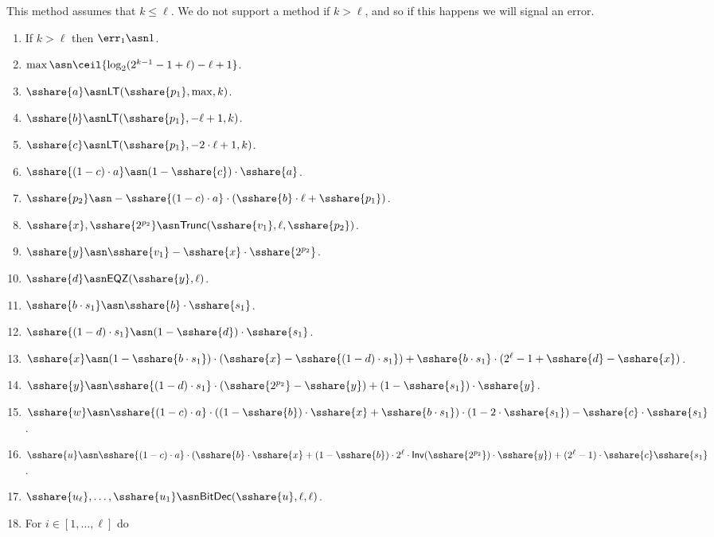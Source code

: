 This method assumes that $k \le \ell$.
We do not support a method if $k > \ell$, and so if this happens
we will signal an error.
\begin{enumerate}
\item If $k>\ell$ then $\err_1 \asn 1$.
\item $\max \asn \ceil{\log_2(2^{k-1}-1+\ell)-\ell+1}$.
\item $\sshare{a} \asn \mathsf{LT}(\sshare{p_1},\max,k)$.
\item $\sshare{b} \asn \mathsf{LT}(\sshare{p_1},-\ell+1,k)$.
\item $\sshare{c} \asn \mathsf{LT}(\sshare{p_1},-2 \cdot \ell+1,k)$.
\item $\sshare{(1-c) \cdot a} \asn (1-\sshare{c}) \cdot \sshare{a}$.
\item $\sshare{p_2} \asn -\sshare{(1-c) \cdot a} \cdot (\sshare{b} \cdot \ell +\sshare{p_1})$.
\item $\sshare{x},\sshare{2^{p_2}} \asn \mathsf{Trunc}(\sshare{v_1},\ell,\sshare{p_2})$.
\item $\sshare{y} \asn \sshare{v_1}-\sshare{x} \cdot \sshare{2^{p_2}}$.
\item $\sshare{d} \asn \mathsf{EQZ}(\sshare{y},\ell)$.
\item $\sshare{b \cdot s_1} \asn \sshare{b} \cdot \sshare{s_1}$.
\item $\sshare{(1-d) \cdot s_1} \asn (1-\sshare{d}) \cdot \sshare{s_1}$.
\item $\sshare{x} \asn (1-\sshare{b \cdot s_1})
	                 \cdot (\sshare{x}-\sshare{(1-d)\cdot s_1})
		+\sshare{b \cdot s_1} \cdot(2^\ell-1+\sshare{d}-\sshare{x})$.
\item $\sshare{y} \asn \sshare{(1-d) \cdot s_1} \cdot (\sshare{2^{p_2}}-\sshare{y})
			+ (1-\sshare{s_1})\cdot \sshare{y}$.
\item $\sshare{w} \asn \sshare{(1-c) \cdot a} \cdot
			((1-\sshare{b}) \cdot\sshare{x}+\sshare{b \cdot s_1})
			\cdot (1-2\cdot \sshare{s_1})-\sshare{c} \cdot \sshare{s_1}$.
\item $\sshare{u} \asn \sshare{(1-c) \cdot a}
			\cdot (\sshare{b} \cdot \sshare{x}
			+(1-\sshare{b}) \cdot 2^\ell \cdot \mathsf{Inv}(\sshare{2^{p_2}})
							\cdot \sshare{y})
			+(2^\ell-1)\cdot \sshare{c} \sshare{s_1}$.
\item $\sshare{u_\ell},\ldots,\sshare{u_1} \asn \mathsf{BitDec}(\sshare{u},\ell,\ell)$.
\item For $i \in [1,\ldots,\ell]$ do

\end{enumerate}
